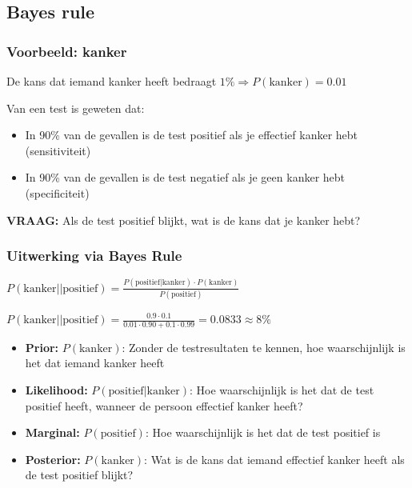 \documentclass{article}
\begin{document}
\subsection{Bayes rule}

\subsubsection{Voorbeeld: kanker}

De kans dat iemand kanker heeft bedraagt $1\% \Rightarrow P(\text{kanker}) = 0.01$

Van een test is geweten dat:

\begin{itemize}
    \item In 90\% van de gevallen is de test positief als je effectief kanker hebt (sensitiviteit)
    \item In 90\% van de gevallen is de test negatief als je geen kanker hebt (specificiteit)
\end{itemize}

\textbf{VRAAG:} Als de test positief blijkt, wat is de kans dat je kanker hebt?


\subsubsection{Uitwerking via Bayes Rule}

\begin{center}
    $P(\text{kanker|}|\text{positief}) = \frac{P(\text{positief}|\text{kanker}) \cdot P(\text{kanker})}{P(\text{positief})}$

    $P(\text{kanker|}|\text{positief}) = \frac{0.9 \cdot 0.1}{0.01 \cdot 0.90 + 0.1 \cdot 0.99} = 0.0833 \approx 8\%$
\end{center}

\begin{itemize}
    \item \textbf{Prior:} $P(\text{kanker})$: Zonder de testresultaten te kennen, hoe waarschijnlijk is het dat iemand kanker heeft
    \item \textbf{Likelihood:} $P(\text{positief}|\text{kanker})$: Hoe waarschijnlijk is het dat de test positief heeft, wanneer de persoon effectief kanker heeft?
    \item \textbf{Marginal:} $P(\text{positief})$: Hoe waarschijnlijk is het dat de test positief is
    \item \textbf{Posterior:} $P(\text{kanker})$: Wat is de kans dat iemand effectief kanker heeft als de test positief blijkt?
\end{itemize}
\end{document}
